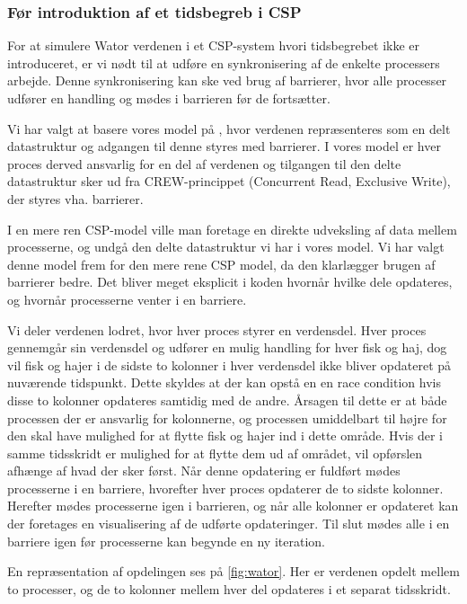\subsubsection*{Før introduktion af et tidsbegreb i CSP} For at simulere Wator 
verdenen i et CSP-system hvori tidsbegrebet ikke er introduceret, er vi nødt 
til at udføre en synkronisering af de enkelte processers arbejde. Denne 
synkronisering kan ske ved brug af barrierer, hvor alle processer udfører en 
handling og mødes i barrieren før de fortsætter.

Vi har valgt at basere vores model på \cite{crew}, hvor verdenen repræsenteres 
som en delt datastruktur og adgangen til denne styres med barrierer. I vores 
model er hver proces derved ansvarlig for en del af verdenen og tilgangen til 
den delte datastruktur sker ud fra CREW-princippet (Concurrent Read, Exclusive 
Write)\cite[5]{crew}, der styres vha. barrierer.  

I en mere ren CSP-model ville man foretage en direkte udveksling af data mellem 
processerne, og undgå den delte datastruktur vi har i vores model.  Vi har 
valgt denne model frem for den mere rene CSP model, da den klarlægger brugen af 
barrierer bedre.  Det bliver meget eksplicit i koden hvornår hvilke dele 
opdateres, og hvornår processerne venter i en barriere.

Vi deler verdenen lodret, hvor hver proces styrer en verdensdel. Hver proces 
gennemgår sin verdensdel og udfører en mulig handling for hver fisk og haj, dog 
vil fisk og hajer i de sidste to kolonner i hver verdensdel ikke bliver 
opdateret på nuværende tidspunkt. Dette skyldes at der kan opstå en en race 
condition hvis disse to kolonner opdateres samtidig med de andre. Årsagen til 
dette er at både processen der er ansvarlig for kolonnerne, og processen 
umiddelbart til højre for den skal have mulighed for at flytte fisk og hajer 
ind i dette område. Hvis der i samme tidsskridt er mulighed for at flytte dem 
ud af området, vil opførslen afhænge af hvad der sker først.  Når denne 
opdatering er fuldført mødes processerne i en barriere, hvorefter hver proces 
opdaterer de to sidste kolonner. Herefter mødes processerne igen i barrieren, 
og når alle kolonner er opdateret kan der foretages en visualisering af de 
udførte opdateringer. Til slut mødes alle i en barriere igen før processerne 
kan begynde en ny iteration.

En repræsentation af opdelingen ses på \cref{fig:wator}. Her er verdenen 
opdelt mellem to processer, og de to kolonner mellem hver del opdateres i et 
separat tidsskridt.  

